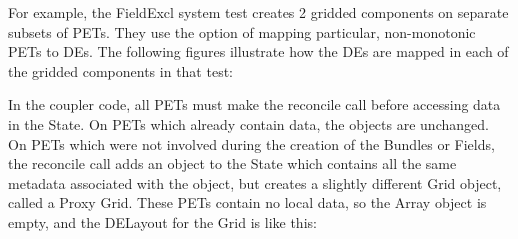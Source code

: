 \begin{enumerate}
For example, the FieldExcl system test creates 2 gridded components
on separate subsets of PETs.  They use the option of mapping
particular, non-monotonic PETs to DEs.  The following figures 
illustrate how the DEs are mapped in each of the gridded components
in that test:





In the coupler code, all PETs must make the reconcile call before
accessing data in the State.  On PETs which already contain data,
the objects are unchanged.  On PETs which were not involved during
the creation of the Bundles or Fields, the reconcile call adds an
object to the State which contains all the same metadata associated
with the object, but creates a slightly different Grid object,
called a Proxy Grid. These PETs contain no local data, so the
Array object is empty, and the DELayout for the Grid is like this:





\end{enumerate}
